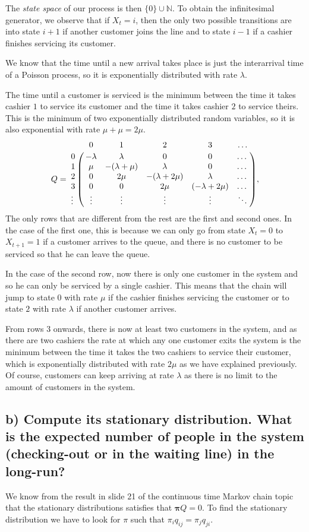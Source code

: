 \documentclass[11pt, a4paper]{article}
\begin{document}
The \emph{state space} of our process is then $\{0\} \cup \mathbb{N}$. 
To obtain the infinitesimal generator, we observe that if $X_t = i$, then the only two possible transitions are into state $i+1$ if another customer joins the line and to state $i-1$ if a cashier finishes servicing its customer.

We know that the time until a new arrival takes place is just the interarrival time of a Poisson process, so it is exponentially distributed with rate $\lambda$.

The time until a customer is serviced is the minimum between the time it takes cashier $1$ to service its customer and the time it takes cashier $2$ to service theirs. 
This is the minimum of two exponentially distributed random variables, so it is also exponential with rate $\mu + \mu = 2\mu$.
\[
Q = \bordermatrix{%
	 & 0 & 1 & 2 & 3 & \dots \cr
	0& -\lambda & \lambda  & 0        & 0        & \dots  \cr
	1 & \mu       & -(\lambda+\mu) & \lambda  & 0        & \dots  \cr
	2& 0        & 2\mu        & -(\lambda+2\mu) & \lambda  & \dots  \cr
	3 &0        & 0        & 2\mu        & (-\lambda + 2\mu) & \dots  \cr
	\vdots & \vdots   & \vdots   & \vdots   & \vdots   & \ddots
},
\]
The only rows that are different from the rest are the first and second ones.
In the case of the first one, this is because we can only go from state $X_t = 0$ to $X_{t+1} = 1$ if a customer arrives to the queue, and there is no customer to be serviced so that he can leave the queue.

In the case of the second row, now there is only one customer in the system and so he can only be serviced by a single cashier. This means that the chain will jump to state $0$ with rate $\mu$ if the cashier finishes servicing the customer or to state $2$ with rate $\lambda$ if another customer arrives.

From rows $3$ onwards, there is now at least two customers in the system, and as there are two cashiers the rate at which any one customer exits the system is the minimum between the time it takes the two cashiers to service their customer, which is exponentially distributed with rate $2\mu$ as we have explained previously.
Of course, customers can keep arriving at rate $\lambda$ as there is no limit to the amount of customers in the system.

\subsection*{b) Compute its stationary distribution. What is the expected number of people in the system (checking-out or in the waiting line) in the long-run?}
We know from the result in slide 21 of the continuous time Markov chain topic that the stationary distributions satisfies that $\bm{\pi}Q = 0$.
To find the stationary distribution we have to look for $\pi$ such that $\pi_i q_{ij} = \pi_j q_{ji}$.
\end{document}
